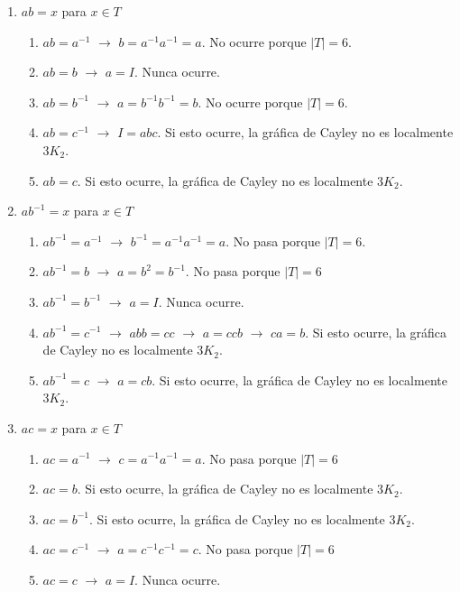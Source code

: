 \documentclass[11pt]{book}
\theoremstyle{definition}
\begin{document}
\begin{enumerate}

\item $ab=x$ para $x\in T$

  \begin{enumerate}
  \item $ab=a^{-1}$ $\rightarrow$ $b=a^{-1}a^{-1}=a$. No ocurre porque
    $|T|=6$.
  \item $ab=b$ $\rightarrow$ $a=I$. Nunca ocurre.
  \item $ab=b^{-1}$ $\rightarrow$ $a=b^{-1}b^{-1}=b$. No ocurre porque
    $|T|=6$.
  \item $ab=c^{-1}$ $\rightarrow$ $I=abc$. Si esto ocurre, la gráfica
    de Cayley no es localmente $3K_2$.
  \item $ab=c$. Si esto ocurre, la gráfica de Cayley no es localmente
    $3K_2$.
  \end{enumerate}

\item $ab^{-1}=x$ para $x\in T$
  \begin{enumerate}
  \item $ab^{-1}=a^{-1}$ $\rightarrow$ $b^{-1}=a^{-1}a^{-1}=a$. No
    pasa porque $|T|=6$.
  \item $ab^{-1}=b$ $\rightarrow$ $a=b^2=b^{-1}$. No pasa porque
    $|T|=6$
  \item $ab^{-1}=b^{-1}$ $\rightarrow$ $a=I$. Nunca ocurre.
  \item $ab^{-1}=c^{-1}$ $\rightarrow$ $abb=cc$ $\rightarrow$ $a=ccb$
    $\rightarrow$ $ca=b$. Si esto ocurre, la gráfica de Cayley no es
    localmente $3K_2$.
  \item $ab^{-1}=c$ $\rightarrow$ $a=cb$. Si esto ocurre, la gráfica
    de Cayley no es localmente $3K_2$.
  \end{enumerate}

\item $ac=x$ para $x\in T$
  \begin{enumerate}
  \item $ac=a^{-1}$ $\rightarrow$ $c=a^{-1}a^{-1}=a$. No pasa porque
    $|T|=6$
  \item $ac=b$. Si esto ocurre, la gráfica de Cayley no es localmente
    $3K_2$.
  \item $ac=b^{-1}$.  Si esto ocurre, la gráfica de Cayley no es
    localmente $3K_2$.
  \item $ac=c^{-1}$ $\rightarrow$ $a=c^{-1}c^{-1}=c$. No pasa porque
    $|T|=6$
  \item $ac=c$ $\rightarrow$ $a=I$. Nunca ocurre.
  \end{enumerate}


\end{enumerate}
\end{document}
